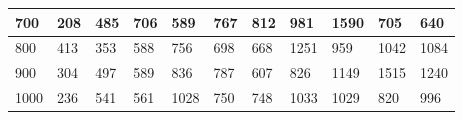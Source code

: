 \documentclass[10pt,letterpaper]{article}
\begin{document}
\begin{center}
\begin{table}
\begin{tabular} { |m{0.5cm}|m{1.3cm}|m{1.3cm}|m{1.3cm}|m{1.3cm}|m{1.3cm}|m{1.3cm}|m{1.3cm}|m{1.3cm}|m{1.3cm}|m{1.3cm}|}
\hline
\cellcolor{Gray}700 & \Large 208 & \Large 485 & \Large 706 & \Large 589 & \Large 767 & \Large 812 & \Large 981 & \Large 1590 & \Large 705 & \Large 640 \\
\hline
\cellcolor{Gray}800 & \Large 413 & \Large 353 & \Large 588 & \Large 756 & \Large 698 & \Large 668 & \Large 1251 & \Large 959 & \Large 1042 & \Large 1084 \\
\hline
\cellcolor{Gray}900 & \Large 304 & \Large 497 & \Large 589 & \Large 836 & \Large 787 & \Large 607 & \Large 826 & \Large 1149 & \Large 1515 & \Large 1240 \\
\hline
\cellcolor{Gray}1000 & \Large 236 & \Large 541 & \Large 561 & \Large 1028 & \Large 750 & \Large 748 & \Large 1033 & \Large 1029 & \Large 820 & \Large 996 \\
\hline
\end{tabular} \\
\end{table}
\end{center}
\newpage 
{}
\end{document}
